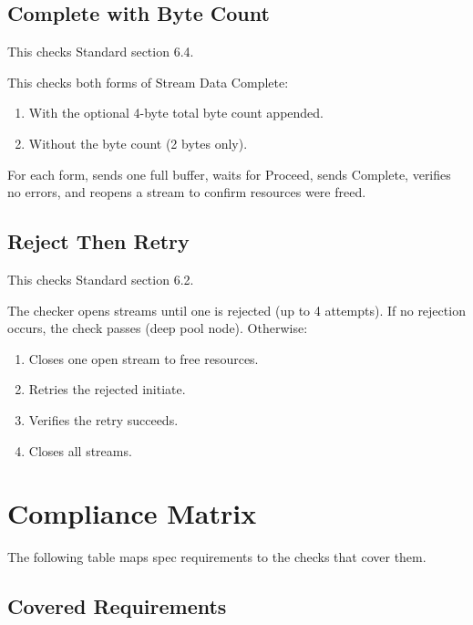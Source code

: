 \subsection{Complete with Byte Count}

This checks Standard section 6.4.

This checks both forms of Stream Data Complete:
\begin{enumerate}
\item With the optional 4-byte total byte count appended.
\item Without the byte count (2 bytes only).
\end{enumerate}
For each form, sends one full buffer, waits for Proceed, sends Complete,
verifies no errors, and reopens a stream to confirm resources were freed.

\subsection{Reject Then Retry}

This checks Standard section 6.2.

The checker opens streams until one is rejected (up to 4 attempts).  If no
rejection occurs, the check passes (deep pool node).  Otherwise:
\begin{enumerate}
\item Closes one open stream to free resources.
\item Retries the rejected initiate.
\item Verifies the retry succeeds.
\item Closes all streams.
\end{enumerate}

\section{Compliance Matrix}

The following table maps spec requirements to the checks that cover them.

\subsection{Covered Requirements}

